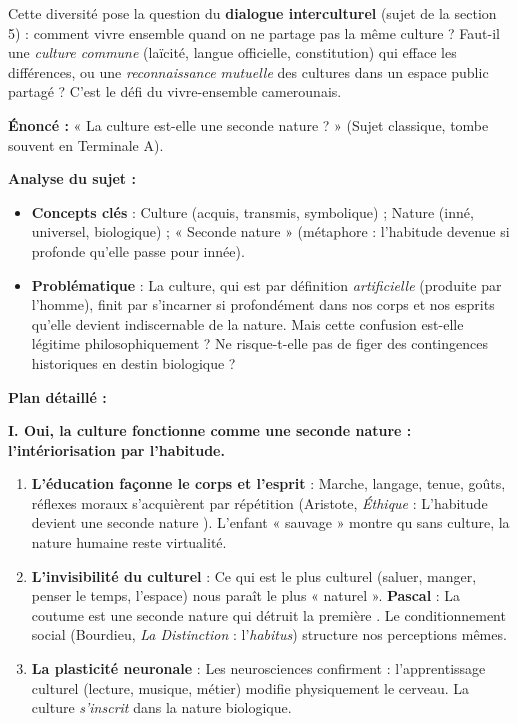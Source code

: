 \documentclass[11pt]{article}
\newcommand{\cle}[1]{{\popxbold\color{popdark}#1}}
\begin{document}
Cette diversité pose la question du \textbf{dialogue interculturel} (sujet de la section 5) : comment vivre ensemble quand on ne partage pas la même culture ? Faut-il une \emph{culture commune} (laïcité, langue officielle, constitution) qui efface les différences, ou une \emph{reconnaissance mutuelle} des cultures dans un espace public partagé ? C'est le défi du \cle{vivre-ensemble} camerounais.

\begin{exoresolu}
\textbf{Énoncé :} « La culture est-elle une seconde nature ? » (Sujet classique, tombe souvent en Terminale A).

\textbf{Analyse du sujet :}
\begin{itemize}
    \item \textbf{Concepts clés} : Culture (acquis, transmis, symbolique) ; Nature (inné, universel, biologique) ; « Seconde nature » (métaphore : l'habitude devenue si profonde qu'elle passe pour innée).
    \item \textbf{Problématique} : La culture, qui est par définition \emph{artificielle} (produite par l'homme), finit par s'incarner si profondément dans nos corps et nos esprits qu'elle devient indiscernable de la nature. Mais cette confusion est-elle légitime philosophiquement ? Ne risque-t-elle pas de figer des contingences historiques en destin biologique ?
\end{itemize}

\textbf{Plan détaillé :}

\textbf{I. Oui, la culture fonctionne comme une seconde nature : l'intériorisation par l'habitude.}
\begin{enumerate}
    \item \textbf{L'éducation façonne le corps et l'esprit} : Marche, langage, tenue, goûts, réflexes moraux s'acquièrent par répétition (Aristote, \emph{Éthique} : \guillemotleft L'habitude devient une seconde nature \guillemotright). L'enfant « sauvage » montre qu sans culture, la nature humaine reste virtualité.
    \item \textbf{L'invisibilité du culturel} : Ce qui est le plus culturel (saluer, manger, penser le temps, l'espace) nous paraît le plus « naturel ». \textbf{Pascal} : \guillemotleft La coutume est une seconde nature qui détruit la première \guillemotright. Le conditionnement social (Bourdieu, \emph{La Distinction} : l'\emph{habitus}) structure nos perceptions mêmes.
    \item \textbf{La plasticité neuronale} : Les neurosciences confirment : l'apprentissage culturel (lecture, musique, métier) modifie physiquement le cerveau. La culture \emph{s'inscrit} dans la nature biologique.
\end{enumerate}


\end{exoresolu}
\end{document}
